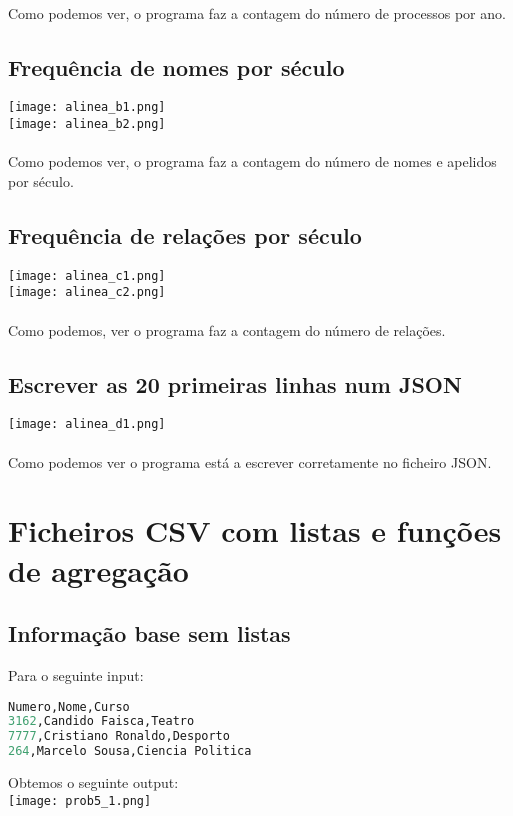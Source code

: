 \documentclass[11pt,a4paper]{report}
\begin{document}
    \paragraph{}
    Como podemos ver, o programa faz a contagem do número de processos por ano.
    
    \subsection{Frequência de nomes por século}
    \texttt{[image: alinea\_b1.png]} \\
	\texttt{[image: alinea\_b2.png]}
    \paragraph{}
    Como podemos ver, o programa faz a contagem do número de nomes e apelidos por século.

    \subsection{Frequência de relações por século}
    \texttt{[image: alinea\_c1.png]} \\
    \texttt{[image: alinea\_c2.png]}

    \paragraph{}
    Como podemos, ver o programa faz a contagem do número de relações.

    \subsection{Escrever as 20 primeiras linhas num JSON}
    \texttt{[image: alinea\_d1.png]} \\
    \paragraph{}
    Como podemos ver o programa está a escrever corretamente no ficheiro JSON.

\section{Ficheiros CSV com listas e funções de agregação}
    \subsection{Informação base sem listas} 
    Para o seguinte input:
\begin{lstlisting}[language=Python]
Numero,Nome,Curso
3162,Candido Faisca,Teatro
7777,Cristiano Ronaldo,Desporto
264,Marcelo Sousa,Ciencia Politica
\end{lstlisting}
Obtemos o seguinte output: \\
\texttt{[image: prob5\_1.png]} \\
\end{document}
